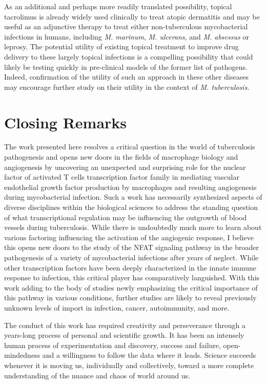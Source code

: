 As an additional and perhaps more readily translated possibility, topical tacrolimus is already widely used clinically to treat atopic dermatitis and may be useful as an adjunctive therapy to treat either non\hyp{}tuberculous mycobacterial infections in humans, including \textit{M. marinum}, \textit{M. ulcerans}, and \textit{M. absessus} or leprosy. The potential utility of existing topical treatment to improve drug delivery to these largely topical infections is a compelling possibility that could likely be testing quickly in pre\hyp{}clinical models of the former list of pathogens. Indeed, confirmation of the utility of such an approach in these other diseases may encourage further study on their utility in the context of \textit{M. tuberculosis}.

\section{Closing Remarks}\label{closing}

The work presented here resolves a critical question in the world of tuberculosis pathogenesis and opens new doors in the fields of macrophage biology and angiogenesis by uncovering an unexpected and surprising role for the nuclear factor of activated T cells transcription factor family in mediating vascular endothelial growth factor production by macrophages and resulting angiogenesis during mycobacterial infection. Such a work has necessarily synthesized aspects of diverse disciplines within the biological sciences to address the standing question of what transcriptional regulation may be influencing the outgrowth of blood vessels during tuberculosis. While there is undoubtedly much more to learn about various factoring influencing the activation of the angiogenic response, I believe this opens new doors to the study of the NFAT signaling pathway in the broader pathogenesis of a variety of mycobacterial infections after years of neglect. While other transcription factors have been deeply characterized in the innate immune response to infection, this critical player has comparatively languished. With this work adding to the body of studies newly emphasizing the critical importance of this pathway in various conditions, further studies are likely to reveal previously unknown levels of import in infection, cancer, autoimmunity, and more.

The conduct of this work has required creativity and perseverance through a years\hyp{}long process of personal and scientific growth. It has been an intensely human process of experimentation and discovery, success and failure, open\hyp{}mindedness and a willingness to follow the data where it leads. Science succeeds whenever it is moving us, individually and collectively, toward a more complete understanding of the nuance and chaos of world around us. 

